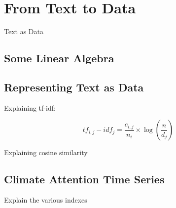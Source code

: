 \chapter{From Text to Data}


 Text as Data

\section{Some Linear Algebra}

\section{Representing Text as Data}

 Explaining tf-idf:

\begin{equation}
tf_{i,j} - idf_{j} = \frac{c_{i,j}}{n_i} \times \log (\frac{n}{d_j})
\end{equation}


Explaining cosine similarity




\section{Climate Attention Time Series}

Explain the various indexes


